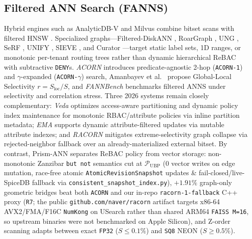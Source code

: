 \documentclass[conference]{IEEEtran}
\begin{document}
\subsection{Filtered ANN Search (FANNS)}
Hybrid engines such as AnalyticDB-V \cite{wei2020analyticdbv} and Milvus \cite{wang2021milvus} combine bitset scans with filtered HNSW \cite{malkov2018hnsw}. Specialized graphs---Filtered-DiskANN \cite{gollapudi2023filtered}, RoarGraph \cite{chen2024roargraph}, UNG \cite{cai2024ung}, SeRF \cite{zuo2024serf}, UNIFY \cite{liang2024unify}, SIEVE \cite{li2025sieve}, and Curator \cite{curator2026}---target static label sets, 1D ranges, or monotonic per-tenant routing trees rather than dynamic hierarchical ReBAC with subtractive \texttt{DENY}s. \textit{ACORN} \cite{patel2024acorn} introduces predicate-agnostic 2-hop (\texttt{ACORN-1}) and $\gamma$-expanded (\texttt{ACORN-$\gamma$}) search, Amanbayev et al.\ \cite{amanbayev2026gls} propose Global-Local Selectivity $r = S_{\text{loc}}/S$, and \textit{FANNBench} \cite{iff2025fannbench} benchmarks filtered ANNS under selectivity and correlation stress. Three 2026 systems remain closely complementary: \textit{Veda} \cite{veda2026} optimizes access-aware partitioning and dynamic policy index maintenance for monotonic RBAC/attribute policies via inline partition metadata; \textit{EMA} \cite{li2026ema} supports dynamic attribute-filtered updates via mutable attribute indexes; and \textit{RACORN} \cite{kim2026racorn} mitigates extreme-selectivity graph collapse via rejected-neighbor fallback over an already-materialized external bitset. By contrast, Prism-ANN separates ReBAC policy from vector storage: non-monotonic Zanzibar \texttt{but not} semantics cut at $\mathcal{P}_{\text{UBP}}$ ($0$ vector writes on edge mutation, race-free atomic \texttt{AtomicRevisionSnapshot} updates \& fail-closed/live-SpiceDB fallback via \texttt{consistent\_snapshot\_index.py}), $+1.91\%$ graph-only geometric bridges beat both \texttt{ACORN} and our in-repo \texttt{racorn-1-fallback} C++ proxy (\texttt{R7}; the public \texttt{github.com/naver/racorn} artifact targets x86-64 AVX2/FMA/F16C \texttt{NumKong} on USearch rather than shared ARM64 \texttt{FAISS M=16}, so upstream \cite{kim2026racorn,veda2026,li2026ema,curator2026} binaries were not benchmarked on Apple Silicon), and Z-order scanning adapts between exact \texttt{FP32} ($S \le 0.1\%$) and \texttt{SQ8} NEON ($S \ge 0.5\%$).
\end{document}
